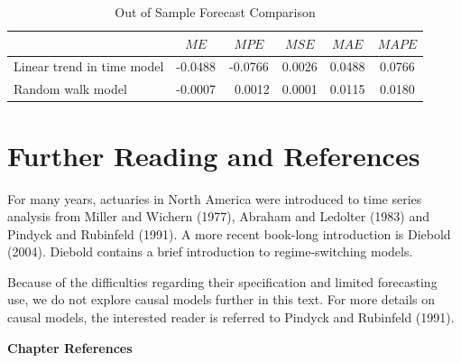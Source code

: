 \begin{table}[h]
\caption{\label{T7:ForecastComparison} Out of Sample Forecast
Comparison}
\begin{center}
\begin{tabular}{c|ccccc}
\hline & $ME$ & $MPE$ & $MSE$ & $MAE$ & $MAPE$ \\ \hline
\multicolumn{1}{l|}{Linear trend in time model} & -0.0488 & -0.0766
& 0.0026
& 0.0488 & 0.0766 \\
\multicolumn{1}{l|}{Random walk model} & -0.0007 & ~0.0012 & 0.0001
& 0.0115 & 0.0180 \\ \hline
\end{tabular}\end{center}\end{table}

\linejed



\section{Further Reading and References}

For many years, actuaries in North America were introduced to time
series analysis from Miller and Wichern (1977), Abraham and Ledolter
(1983) and Pindyck and Rubinfeld (1991). A more recent book-long
introduction is Diebold (2004). Diebold contains a brief
introduction to regime-switching models.


Because of the difficulties regarding their specification and
limited forecasting use, we do not explore causal models further in
this text. For more details on causal models, the interested reader
is referred to Pindyck and Rubinfeld (1991).

\bigskip

\textbf{Chapter References}

